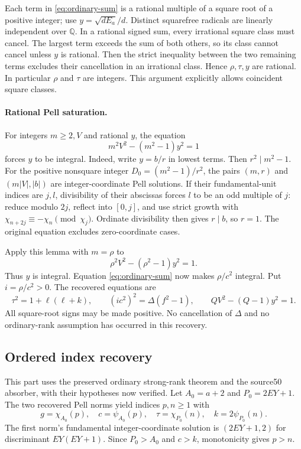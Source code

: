 Each term in \eqref{eq:ordinary-sum} is a rational multiple of a square
root of a positive integer; use $y=\sqrt{dE_a}/d$. Distinct squarefree
radicals are linearly independent over $\mathbb Q$. In a rational signed
sum, every irrational square class must cancel. The largest term exceeds
the sum of both others, so its class cannot cancel unless $y$ is rational.
Then the strict inequality between the two remaining terms excludes their
cancellation in an irrational class. Hence $\rho,\tau,y$ are rational.
In particular $\rho$ and $\tau$ are integers. This argument explicitly
allows coincident square classes.

\paragraph{Rational Pell saturation.}
For integers $m\ge2,V$ and rational $y$, the equation
\[
 m^2V^2-(m^2-1)y^2=1
\]
forces $y$ to be integral. Indeed, write $y=b/r$ in lowest terms. Then
$r^2\mid m^2-1$. For the positive nonsquare integer
$D_0=(m^2-1)/r^2$, the pairs $(m,r)$ and $(m|V|,|b|)$ are
integer-coordinate Pell solutions. If their fundamental-unit indices are
$j,l$, divisibility of their abscissas forces $l$ to be an odd multiple of
$j$: reduce modulo $2j$, reflect into $[0,j]$, and use strict growth with
$\chi_{n+2j}\equiv-\chi_n\pmod {\chi_j}$. Ordinate divisibility then gives
$r\mid b$, so $r=1$. The original equation excludes zero-coordinate cases.

Apply this lemma with $m=\rho$ to
\[
 \rho^2V^2-(\rho^2-1)y^2=1.
\]
Thus $y$ is integral. Equation \eqref{eq:ordinary-sum} now makes
$\rho/c^2$ integral. Put $i=\rho/c^2>0$. The recovered equations are
\[
 \tau^2=1+\ell(\ell+k),\qquad
 (ic^2)^2=\Delta(f^2-1),\qquad QV^2-(Q-1)y^2=1.
\]
All square-root signs may be made positive. No cancellation of $\Delta$
and no ordinary-rank assumption has occurred in this recovery.

\subsection{Ordered index recovery}
This part uses the preserved ordinary strong-rank theorem and the source50
absorber, with their hypotheses now verified. Let $A_0=a+2$ and
$P_0=2EY+1$. The two recovered Pell norms yield indices $p,n\ge1$ with
\[
 g=\chi_{A_0}(p),\quad c=\psi_{A_0}(p),\quad
 \tau=\chi_{P_0}(n),\quad k=2\psi_{P_0}(n).
\]
The first norm's fundamental integer-coordinate solution is
$(2EY+1,2)$ for discriminant $EY(EY+1)$. Since $P_0>A_0$ and $c>k$,
monotonicity gives $p>n$.

